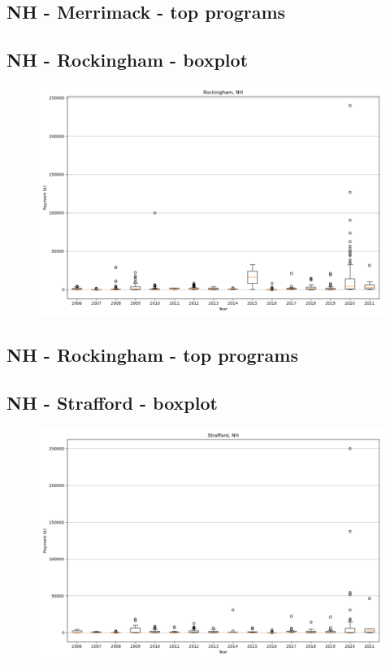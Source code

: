 \subsection*{NH - Merrimack - top programs}

\newpage
\subsection*{NH - Rockingham - boxplot}
\begin{figure}[h]
\centering
\includegraphics[width=7in]{../output/boxplots/counties/Rockingham-NH_boxplot.png}
\end{figure}


\subsection*{NH - Rockingham - top programs}

\newpage
\subsection*{NH - Strafford - boxplot}
\begin{figure}[h]
\centering
\includegraphics[width=7in]{../output/boxplots/counties/Strafford-NH_boxplot.png}
\end{figure}


